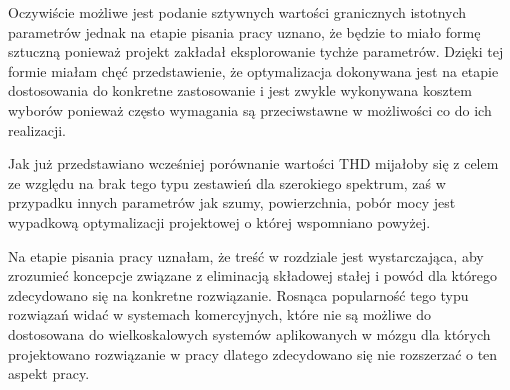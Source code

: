 \begin{frame}[t]


    
\end{frame}




\begin{frame}[t]
    \begin{block}{\af}
    \end{block}
\end{frame}
Oczywiście możliwe jest podanie sztywnych wartości granicznych istotnych parametrów jednak na etapie pisania pracy uznano, że będzie to miało formę sztuczną ponieważ projekt zakładał eksplorowanie tychże parametrów.
Dzięki tej formie miałam chęć przedstawienie, że optymalizacja dokonywana jest na etapie dostosowania do konkretne zastosowanie i jest zwykle wykonywana kosztem wyborów ponieważ często wymagania są przeciwstawne w możliwości co do ich realizacji.

Jak już przedstawiano wcześniej porównanie wartości THD mijałoby się z celem ze względu na brak tego typu zestawień dla szerokiego spektrum, zaś w przypadku innych parametrów jak szumy, powierzchnia, pobór mocy jest wypadkową optymalizacji projektowej o której wspomniano powyżej.



\begin{frame}[t]
    \begin{block}{\dk}
    \end{block}

    Na etapie pisania pracy uznałam, że treść w rozdziale jest wystarczająca, aby zrozumieć koncepcje związane z eliminacją składowej stałej i powód dla którego zdecydowano się na konkretne rozwiązanie.
    Rosnąca popularność tego typu rozwiązań widać w systemach komercyjnych, które nie są możliwe do dostosowana do wielkoskalowych systemów aplikowanych w mózgu dla których projektowano rozwiązanie w pracy dlatego zdecydowano się nie rozszerzać o ten aspekt pracy.
\end{frame}


